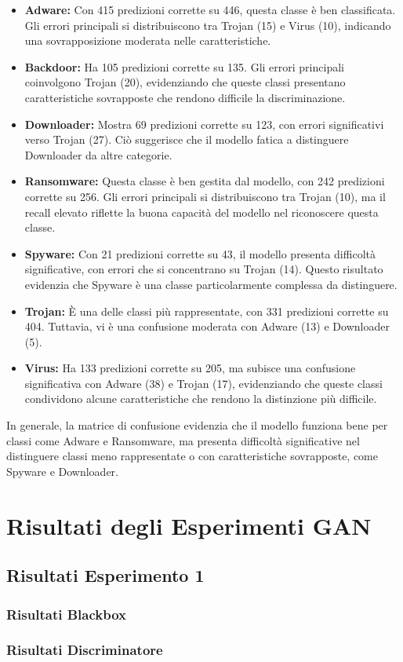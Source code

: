 \begin{itemize}
    \item \textbf{Adware:} Con 415 predizioni corrette su 446, questa classe è ben classificata. Gli errori principali si distribuiscono tra Trojan (15) e Virus (10), indicando una sovrapposizione moderata nelle caratteristiche.
    
    \item \textbf{Backdoor:} Ha 105 predizioni corrette su 135. Gli errori principali coinvolgono Trojan (20), evidenziando che queste classi presentano caratteristiche sovrapposte che rendono difficile la discriminazione.
    
    \item \textbf{Downloader:} Mostra 69 predizioni corrette su 123, con errori significativi verso Trojan (27). Ciò suggerisce che il modello fatica a distinguere Downloader da altre categorie.
    
    \item \textbf{Ransomware:} Questa classe è ben gestita dal modello, con 242 predizioni corrette su 256. Gli errori principali si distribuiscono tra Trojan (10), ma il recall elevato riflette la buona capacità del modello nel riconoscere questa classe.
    
    \item \textbf{Spyware:} Con 21 predizioni corrette su 43, il modello presenta difficoltà significative, con errori che si concentrano su Trojan (14). Questo risultato evidenzia che Spyware è una classe particolarmente complessa da distinguere.
    
    \item \textbf{Trojan:} È una delle classi più rappresentate, con 331 predizioni corrette su 404. Tuttavia, vi è una confusione moderata con Adware (13) e Downloader (5).
    
    \item \textbf{Virus:} Ha 133 predizioni corrette su 205, ma subisce una confusione significativa con Adware (38) e Trojan (17), evidenziando che queste classi condividono alcune caratteristiche che rendono la distinzione più difficile.
\end{itemize}
In generale, la matrice di confusione evidenzia che il modello funziona bene per classi come Adware e Ransomware, ma presenta difficoltà significative nel distinguere classi meno rappresentate o con caratteristiche sovrapposte, come Spyware e Downloader.


\section{Risultati degli Esperimenti GAN}
\subsection{Risultati Esperimento 1}
\subsubsection{Risultati Blackbox}

\subsubsection{Risultati Discriminatore}
~\\ 
